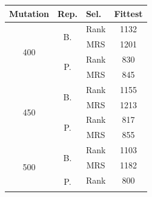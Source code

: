 \documentclass[10pt,a4paper,openbib]{article}
\begin{document}
\begin{multicols}{2}
\begin{table}[H]
\centering
\begin{tabular}{|c|c|c|c|}
\hline
\multicolumn{1}{|l|}{\textbf{Mutation}} & \multicolumn{1}{l|}{\textbf{Rep.}} & \multicolumn{1}{l|}{\textbf{Sel.}} & \multicolumn{1}{l|}{\textbf{Fittest}} \\ \hline
\multirow{4}{*}{400}                    & \multirow{2}{*}{B.}                & Rank                               & 1132                                  \\ \cline{3-4} 
                                        &                                    & MRS                                & 1201                                  \\ \cline{2-4} 
                                        & \multirow{2}{*}{P.}                & Rank                               & 830                                   \\ \cline{3-4} 
                                        &                                    & MRS                                & 845                                   \\ \hline
\multirow{4}{*}{450}                    & \multirow{2}{*}{B.}                & Rank                               & 1155                                  \\ \cline{3-4} 
                                        &                                    & MRS                                & 1213                                  \\ \cline{2-4} 
                                        & \multirow{2}{*}{P.}                & Rank                               & 817                                   \\ \cline{3-4} 
                                        &                                    & MRS                                & 855                                   \\ \hline
\multirow{4}{*}{500}                    & \multirow{2}{*}{B.}                & Rank                               & 1103                                  \\ \cline{3-4} 
                                        &                                    & MRS                                & 1182                                  \\ \cline{2-4} 
                                        & \multirow{2}{*}{P.}                & Rank                               & 800                                   \\ \cline{3-4} 

\end{tabular}
\end{table}
\end{multicols}
\end{document}
